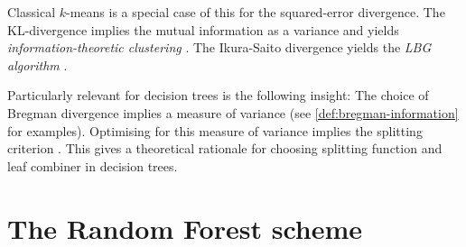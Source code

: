 \documentclass[../main.tex]{subfiles}
\begin{document}
Classical $k$-means is a special case of this for the squared-error divergence. The KL-divergence implies the mutual information as a variance and yields \textit{information-theoretic clustering} \cite{todo}. The Ikura-Saito divergence yields the \textit{LBG algorithm} \cite{todo}.


Particularly relevant for decision trees is the following insight: The choice of Bregman divergence implies a measure of variance (see \ref{def:bregman-information} for examples). Optimising for this measure of variance implies the splitting criterion . This gives a theoretical rationale for choosing splitting function and leaf combiner in decision trees.





\section{The Random Forest scheme}
\label{sec:random-forest-scheme}


\end{document}
